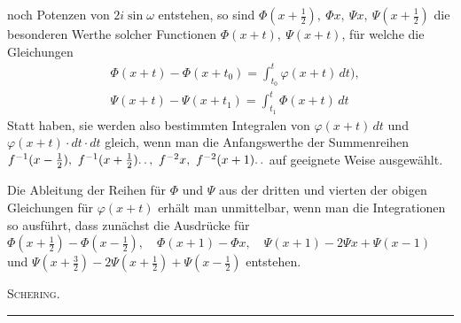 noch Potenzen von $2i\sin\omega$ entstehen,
so sind $\Phi(x+\tfrac12),\ \Phi x,\ \Psi x,\ \Psi(x+\tfrac12)$ die besonderen Werthe solcher Functionen
$\Phi(x+t),\ \Psi(x+t)$,
für welche die Gleichungen
\[
\begin{aligned}
&\Phi(x+t)-\Phi(x+t_0)=\int_{t_0}^{t}\varphi(x+t)\,dt),\\[6pt]
&\Psi(x+t)-\Psi(x+t_1)=\int_{t_1}^{t}\Phi(x+t)\,dt
\end{aligned}
\]
Statt haben, sie werden also bestimmten Integralen von $\varphi(x+t)\,dt$ und
$\varphi(x+t)\cdot dt\cdot dt$ gleich, wenn
man die Anfangswerthe der Summenreihen
$f^{-1}(x-\tfrac12),\ f^{-1}(x+\tfrac12)\ldotp\ldotp,\ f^{-2}x,\ f^{-2}(x+1)\ldotp\ldotp$
auf geeignete Weise ausgewählt.

Die Ableitung der Reihen für $\Phi$ und $\Psi$ aus der dritten und vierten der obigen Gleichungen für
$\varphi(x+t)$ erhält man unmittelbar, wenn man die Integrationen so ausführt, dass zunächst die Ausdrücke für
$\Phi(x+\tfrac12)-\Phi(x-\tfrac12),\quad \Phi(x+1)-\Phi x,\quad
\Psi(x+1)-2\Psi x+\Psi(x-1)$ und
$\Psi(x+\tfrac32)-2\Psi(x+\tfrac12)+\Psi(x-\tfrac12)$
entstehen.
\begin{flushright}\textsc{Schering.}\end{flushright}
\begin{center}\rule{9em}{0.3pt}\end{center}
